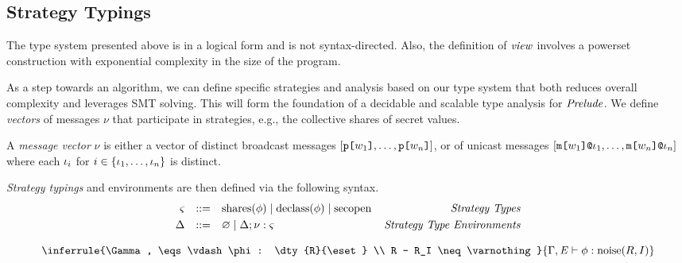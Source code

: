 \subsection{Strategy Typings}

The type system presented above is in a logical form and is not syntax-directed.
Also, the definition of $\mathit{view}$ involves a powerset construction with exponential
complexity in the size of the program.

As a step towards an algorithm, we can define specific strategies and analysis
based on our type system that both reduces overall complexity and leverages SMT
solving. This will form the foundation of a decidable and scalable type analysis
for $\mathit{Prelude}$.  We define \emph{vectors} of messages $\nu$ that participate in strategies,
e.g., the collective shares of secret values.
\begin{definition}
  A \emph{message vector} $\nu$ is either a vector of distinct
  broadcast messages $[\texttt{p[}w_1\texttt{]},\ldots,\texttt{p[}w_n\texttt{]}]$, or of unicast
  messages $[\texttt{m[}w_1\texttt{]}\texttt{@}\iota_1,\ldots,\texttt{m[}w_n\texttt{]}\texttt{@}\iota_n]$ where
  each $\iota_i$ for $i \in \{ \iota_1,\ldots,\iota_n \}$ is distinct.  
\end{definition}

\emph{Strategy typings} and environments are then defined via the following syntax.
$$
\begin{array}{rcl@{\hspace{4mm}}r}
\sty &::=& \sharet{\phi} \mid \declasst{\phi} \mid \secopent & \gdesc{Strategy Types} \\[1mm]
\Delta &::=& \varnothing \mid \Delta; \nu : \sty & \gdesc{Strategy Type Environments}
\end{array}
$$

$$
\inferrule
    {\Gamma, \eqs \vdash \phi : \dty{R}{\eset} \\ R - R_I \neq \varnothing}
    {\Gamma, \eqs \vdash \phi : \noise(R,I)}
$$

